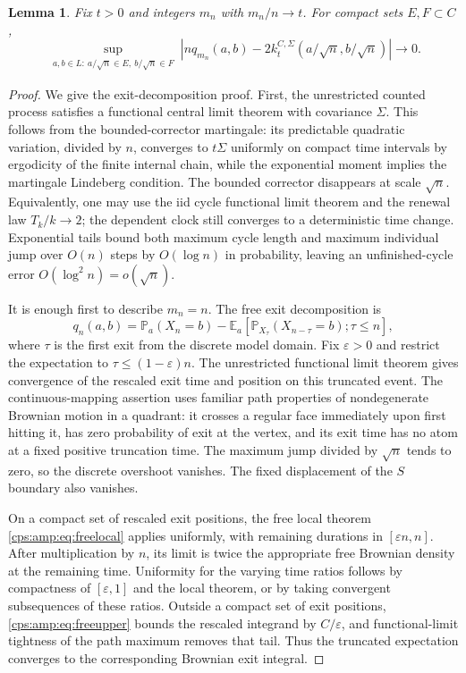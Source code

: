 \documentclass[11pt,letterpaper]{article}
\numberwithin{equation}{section}
\newtheorem{lemma}[theorem]{Lemma}
\theoremstyle{remark}\newtheorem{remark}[theorem]{Remark}
\newcommand{\PP}{\mathbb P}
\newcommand{\EE}{\mathbb E}
\begin{document}
\begin{lemma}\label{cps:amp:lem:killed}
Fix $t>0$ and integers $m_n$ with $m_n/n\to t$. For compact sets $E,F\subset C$,
\begin{equation}\label{cps:amp:eq:killedlocal}
 \sup_{\substack{a,b\in L:\ a/\sqrt n\in E,\ b/\sqrt n\in F}}
 \left|nq_{m_n}(a,b)-2k_t^{C,\Sigma}(a/\sqrt n,b/\sqrt n)\right|
 \longrightarrow0.
\end{equation}
\end{lemma}
\begin{proof}
We give the exit-decomposition proof. First, the unrestricted counted process satisfies a functional central limit theorem with covariance $\Sigma$. This follows from the bounded-corrector martingale: its predictable quadratic variation, divided by $n$, converges to $t\Sigma$ uniformly on compact time intervals by ergodicity of the finite internal chain, while the exponential moment implies the martingale Lindeberg condition. The bounded corrector disappears at scale $\sqrt n$. Equivalently, one may use the iid cycle functional limit theorem and the renewal law $T_k/k\to2$; the dependent clock still converges to a deterministic time change. Exponential tails bound both maximum cycle length and maximum individual jump over $O(n)$ steps by $O(\log n)$ in probability, leaving an unfinished-cycle error $O(\log^2n)=o(\sqrt n)$.

It is enough first to describe $m_n=n$. The free exit decomposition is
\begin{equation}\label{cps:amp:eq:Hunt}
 q_n(a,b)=\PP_a(X_n=b)
 -\EE_a[\PP_{X_\tau}(X_{n-\tau}=b);\tau\le n],
\end{equation}
where $\tau$ is the first exit from the discrete model domain. Fix $\varepsilon>0$ and restrict the expectation to $\tau\le(1-\varepsilon)n$. The unrestricted functional limit theorem gives convergence of the rescaled exit time and position on this truncated event. The continuous-mapping assertion uses familiar path properties of nondegenerate Brownian motion in a quadrant: it crosses a regular face immediately upon first hitting it, has zero probability of exit at the vertex, and its exit time has no atom at a fixed positive truncation time. The maximum jump divided by $\sqrt n$ tends to zero, so the discrete overshoot vanishes. The fixed displacement of the $S$ boundary also vanishes.

On a compact set of rescaled exit positions, the free local theorem \eqref{cps:amp:eq:freelocal} applies uniformly, with remaining durations in $[\varepsilon n,n]$. After multiplication by $n$, its limit is twice the appropriate free Brownian density at the remaining time. Uniformity for the varying time ratios follows by compactness of $[\varepsilon,1]$ and the local theorem, or by taking convergent subsequences of these ratios. Outside a compact set of exit positions, \eqref{cps:amp:eq:freeupper} bounds the rescaled integrand by $C/\varepsilon$, and functional-limit tightness of the path maximum removes that tail. Thus the truncated expectation converges to the corresponding Brownian exit integral.


\end{proof}
\end{document}
